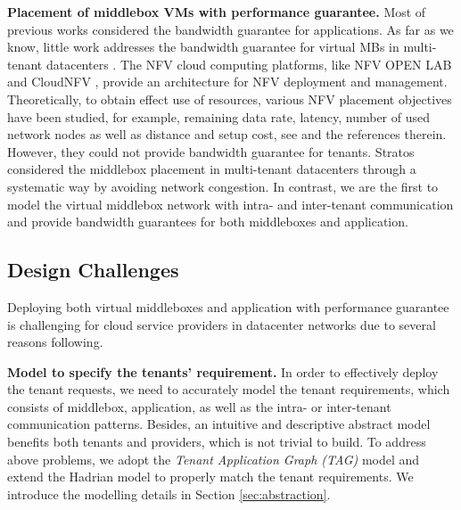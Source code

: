 \documentclass[review]{elsarticle}
\begin{document}
\textbf{Placement of middlebox VMs with performance guarantee.}
Most of previous works considered the bandwidth guarantee for applications. As far as we know, little work addresses the bandwidth guarantee for virtual MBs in multi-tenant datacenters \cite{nfv_challenges}. The NFV cloud computing platforms, like NFV OPEN LAB \cite{HuaweiNFV} and CloudNFV \cite{CloudNFV}, provide an architecture for NFV deployment and management.
 Theoretically, to obtain effect use of resources, various NFV placement objectives have been studied, for example, remaining data rate, latency, number of used network nodes as well as distance and setup cost, see \cite{M14sap, cohen2015near} and the references therein. However, they could not provide bandwidth guarantee for tenants. Stratos \cite{stratos12} considered the middlebox placement in multi-tenant datacenters through a systematic way by avoiding network congestion. In contrast,
 we are the first to model the virtual middlebox network with intra- and inter-tenant communication and provide bandwidth guarantees for both middleboxes and application.
 

\subsection{Design Challenges}

Deploying both virtual middleboxes and application with performance guarantee is challenging for cloud service providers in datacenter networks due to several reasons following. 

\textbf{Model to specify the tenants' requirement.}
In order to effectively deploy the tenant requests, we need to accurately model the tenant requirements, which consists of middlebox, application, as well as the intra- or inter-tenant communication patterns. Besides, an intuitive and descriptive abstract model benefits both tenants and providers, which is not trivial to build. To address above problems, we adopt the \emph{Tenant Application Graph (TAG)} \cite{cloudmirror} model and extend the Hadrian \cite{B13cta} model to properly match the tenant requirements. We introduce the modelling details in Section \ref{sec:abstraction}. 
\end{document}
